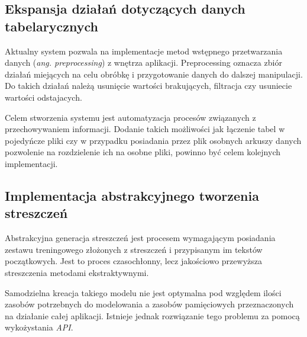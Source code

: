 \documentclass[12pt,a4paper,twoside]{article}
\begin{document}
\subsection{Ekspansja działań dotyczących danych tabelarycznych}
Aktualny system pozwala na implementacje metod wstępnego przetwarzania danych (\textit{ang. preprocessing}) z wnętrza aplikacji. Preprocessing oznacza zbiór działań miejących na celu obróbkę i przygotowanie danych do dalszej manipulacji. Do takich działań należą usunięcie wartości brakujących, filtracja czy usuniecie wartości odstajacych. \par
Celem stworzenia systemu jest automatyzacja procesów związanych z przechowywaniem informacji. Dodanie takich możliwości jak łączenie tabel w pojedyńcze pliki czy w przypadku posiadania przez plik osobnych arkuszy danych pozwolenie na rozdzielenie ich na osobne pliki, powinno być celem kolejnych implementacji.
\subsection{Implementacja abstrakcyjnego tworzenia streszczeń}
Abstrakcyjna generacja streszczeń jest procesem wymagającym posiadania zestawu treningowego złożonych z streszczeń i przypisanym im tekstów początkowych. Jest to proces czasochłonny, lecz jakościowo przewyższa streszczenia metodami ekstraktywnymi. \par
Samodzielna kreacja takiego modelu nie jest optymalna pod względem ilości zasobów potrzebnych do modelowania a zasobów pamięciowych przeznaczonych na działanie całej aplikacji. Istnieje jednak rozwiązanie tego problemu za pomocą wykożystania \textit{API}. 
\end{document}

